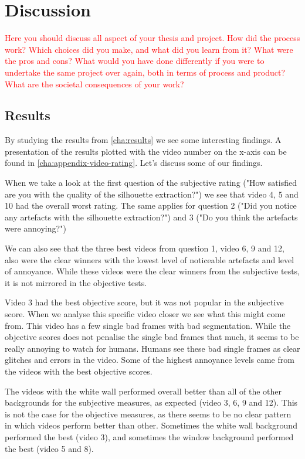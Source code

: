\chapter{Discussion}\label{cha:discussion}
%
\textcolor{red}{Here you should discuss all aspect of your thesis and project. How did the process work? Which choices did you make, and what did you learn from it? What were the pros and cons? What would you have done differently if you were to undertake the same project over again, both in terms of process and product? What are the societal consequences of your work?}

\section{Results}\label{sec:disc_results}
By studying the results from \autoref{cha:results} we see some interesting findings. A presentation of the results plotted with the video number on the x-axis can be found in \autoref{cha:appendix-video-rating}. Let's discuss some of our findings.

When we take a look at the first question of the subjective rating ("How satisfied are you with the quality of the silhouette extraction?") we see that video 4, 5 and 10 had the overall worst rating. The same applies for question 2 ("Did you notice any artefacts with the silhouette extraction?") and 3 ("Do you think the artefacts were annoying?")

We can also see that the three best videos from question 1, video 6, 9 and 12, also were the clear winners with the lowest level of noticeable artefacts and level of annoyance. While these videos were the clear winners from the subjective tests, it is not mirrored in the objective tests. 

Video 3 had the best objective score, but it was not popular in the subjective score. When we analyse this specific video closer we see what this might come from. This video has a few single bad frames with bad segmentation. While the objective scores does not penalise the single bad frames that much, it seems to be really annoying to watch for humans. Humans see these bad single frames as clear glitches and errors in the video. Some of the highest annoyance levels came from the videos with the best objective scores. 

The videos with the white wall performed overall better than all of the other backgrounds for the subjective measures, as expected (video 3, 6, 9 and 12). This is not the case for the objective measures, as there seems to be no clear pattern in which videos perform better than other. Sometimes the white wall background performed the best (video 3), and sometimes the window background performed the best (video 5 and 8).

